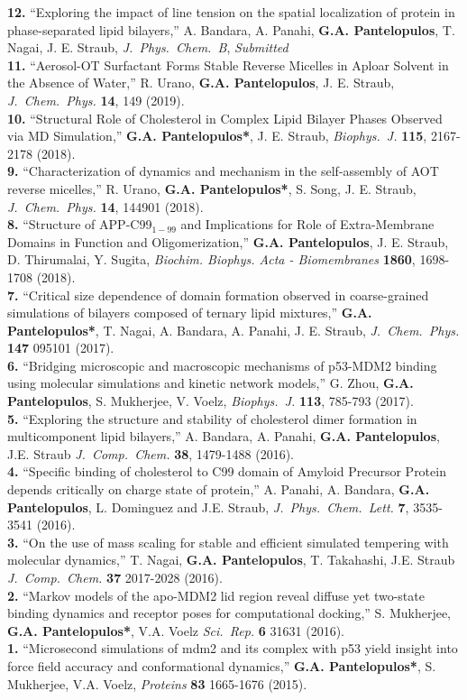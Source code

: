 \documentclass[a4paper]{article}
\def\jcc{\it J.~Comp.~Chem.}
\def\jpcb{\it J.~Phys.~Chem.~B}
\def\jpcl{\it J.~Phys.~Chem.~Lett.}
\def\prot{\it Proteins}
\def\jcp{\it J.~Chem.~Phys.}
\def\bj{\it Biophys.~J.}
\def\jpcb{\it J.~Phys.~Chem.~B}
\def\jpcl{\it J.~Phys.~Chem.~Lett.}
\def\scirep{\it Sci.~Rep.}
\begin{document}
{\bf 12.} ``Exploring the impact of line tension on the spatial localization of protein in phase-separated lipid bilayers,''  A. Bandara, A. Panahi, \textbf{G.A. Pantelopulos}, T. Nagai, J. E. Straub, {\jpcb}, \textit{Submitted}\\
{\bf 11.} ``Aerosol-OT Surfactant Forms Stable Reverse Micelles in Aploar Solvent in the Absence of Water,'' R. Urano, \textbf{G.A. Pantelopulos}, J. E. Straub, {\jcp} {\bf 14}, 149 (2019). \\
{\bf 10.} ``Structural Role of Cholesterol in Complex Lipid Bilayer Phases Observed via MD Simulation,'' \textbf{G.A. Pantelopulos*}, J. E. Straub, {\bj} {\bf 115}, 2167-2178 (2018). \\
{\bf 9.} ``Characterization of dynamics and mechanism in the self-assembly of AOT reverse micelles,'' R. Urano, \textbf{G.A. Pantelopulos*}, S. Song, J. E. Straub, {\jcp} {\bf 14}, 144901 (2018). \\
{\bf 8.} ``Structure of APP-C99$_{1-99}$ and Implications for Role of Extra-Membrane Domains in Function and Oligomerization,'' \textbf{G.A. Pantelopulos}, J. E. Straub, D. Thirumalai, Y. Sugita, \textit{Biochim. Biophys. Acta - Biomembranes} {\bf 1860}, 1698-1708 (2018). \\
{\bf 7.} ``Critical size dependence of domain formation observed in coarse-grained simulations of bilayers composed of ternary lipid mixtures,'' \textbf{G.A. Pantelopulos*}, T. Nagai, A. Bandara, A. Panahi, J. E. Straub, {\jcp} {\bf 147} 095101 (2017). \\
{\bf 6.} ``Bridging microscopic and macroscopic mechanisms of p53-MDM2 binding using molecular simulations and kinetic network models,'' G. Zhou, \textbf{G.A. Pantelopulos}, S. Mukherjee, V. Voelz, {\bj} {\bf 113},  785-793 (2017). \\
{\bf 5.} ``Exploring the structure and stability of cholesterol dimer formation in multicomponent lipid bilayers,'' A. Bandara, A. Panahi, \textbf{G.A. Pantelopulos}, J.E. Straub {\jcc} {\bf 38}, 1479-1488 (2016). \\
{\bf 4.}  ``Specific binding of cholesterol to C99 domain of Amyloid Precursor Protein depends critically on charge state of protein,'' A. Panahi, A. Bandara, \textbf{G.A. Pantelopulos}, L. Dominguez and J.E. Straub, {\jpcl} {\bf 7}, 3535-3541 (2016). \\
{\bf 3.} ``On the use of mass scaling for stable and efficient simulated tempering with molecular dynamics,'' T. Nagai, \textbf{G.A. Pantelopulos}, T. Takahashi, J.E. Straub {\jcc} {\bf 37} 2017-2028 (2016). \\
{\bf 2.} ``Markov models of the apo-MDM2 lid region reveal diffuse yet two-state binding dynamics and receptor poses for computational docking,'' S. Mukherjee, \textbf{G.A. Pantelopulos*}, V.A. Voelz {\scirep} {\bf 6} 31631 (2016). \\
{\bf 1.} ``Microsecond simulations of mdm2 and its complex with p53 yield insight into force field accuracy and conformational dynamics,'' \textbf{G.A. Pantelopulos*}, S. Mukherjee, V.A. Voelz, {\prot} {\bf 83} 1665-1676 (2015).
\end{document}
